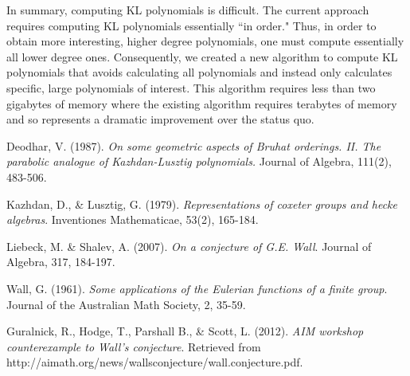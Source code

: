 \documentclass[12pt]{article} %
\begin{document}
In summary, computing KL polynomials is difficult. The current approach requires computing KL polynomials essentially ``in order." Thus, in order to obtain more interesting, higher degree polynomials, one must compute essentially all lower degree ones. Consequently, we created a new algorithm to compute KL polynomials that avoids calculating all polynomials and instead only calculates specific, large polynomials of interest. This algorithm requires less than two gigabytes of memory where the existing algorithm requires terabytes of memory and so represents a dramatic improvement over the status quo.


\begin{thebibliography}{9}

Deodhar, V. (1987).
 \emph{On some geometric aspects of Bruhat orderings. II. The parabolic analogue of Kazhdan-Lusztig polynomials.} Journal of Algebra, 111(2), 483-506.

Kazhdan, D., \& Lusztig, G. (1979).
 \emph{Representations of coxeter groups and hecke algebras}. Inventiones Mathematicae, 53(2), 165-184.

Liebeck, M. \& Shalev, A. (2007).
 \emph{On a conjecture of G.E. Wall}. Journal of Algebra, 317, 184-197.

Wall, G. (1961).
 \emph{Some applications of the Eulerian functions of a finite group}. Journal of the Australian Math Society, 2, 35-59.

Guralnick, R., Hodge, T., Parshall B., \& Scott, L. (2012).
 \emph{AIM workshop counterexample to Wall's conjecture}. Retrieved from \\http://aimath.org/news/wallsconjecture/wall.conjecture.pdf.

\end{thebibliography}
\end{document}
